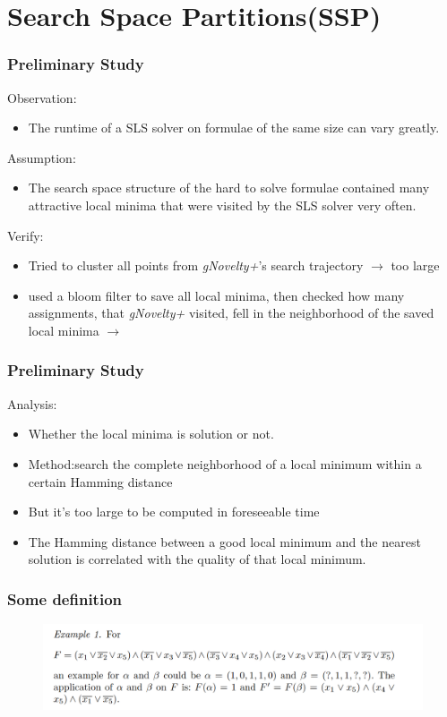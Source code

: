\documentclass[aspectratio=169%
,serif,mathserif]{beamer}
\begin{document}
\section{Search Space Partitions(SSP)}
\begin{frame}
	\frametitle{Preliminary Study}
	Observation: 
	\begin{itemize}
		\item The runtime of a SLS solver on formulae of the same size can vary greatly.
	\end{itemize}
	Assumption:
	\begin{itemize}
		\item The search space structure of the hard to solve formulae contained many attractive local minima that were visited by the SLS solver very often.
	\end{itemize}
	Verify:
	\begin{itemize}
		\item Tried to cluster all points from \emph{gNovelty+}'s search trajectory $\to$ too large
		\item used a bloom filter to save all local minima, then checked how many assignments, that \emph{gNovelty+} visited, fell in the neighborhood of the saved local minima $\to$ 
	\end{itemize}
\end{frame}

\begin{frame}
	\frametitle{Preliminary Study}
	Analysis:
	\begin{itemize}
		\item Whether the local minima  is solution or not.
		\item Method:search the complete neighborhood of a local minimum within a certain Hamming distance
		\item But it's too large to be computed in foreseeable time
		\item The Hamming distance between a good local minimum and the nearest solution is correlated with the quality of that local minimum.
	\end{itemize}
\end{frame}

\begin{frame}
	\frametitle{Some definition}
	\begin{figure}[htbp]
		\includegraphics[width=1\linewidth]{1.png}
	\end{figure}
\end{frame}
\end{document}
